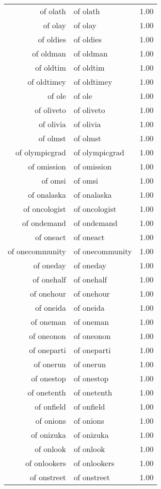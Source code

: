 \begin{table}[ht]
\begin{tabular}{rlr}
  of olath & of olath & 1.00 \\ 
  of olay & of olay & 1.00 \\ 
  of oldies & of oldies & 1.00 \\ 
  of oldman & of oldman & 1.00 \\ 
  of oldtim & of oldtim & 1.00 \\ 
  of oldtimey & of oldtimey & 1.00 \\ 
  of ole & of ole & 1.00 \\ 
  of oliveto & of oliveto & 1.00 \\ 
  of olivia & of olivia & 1.00 \\ 
  of olmst & of olmst & 1.00 \\ 
  of olympicgrad & of olympicgrad & 1.00 \\ 
  of omission & of omission & 1.00 \\ 
  of omsi & of omsi & 1.00 \\ 
  of onalaska & of onalaska & 1.00 \\ 
  of oncologist & of oncologist & 1.00 \\ 
  of ondemand & of ondemand & 1.00 \\ 
  of oneact & of oneact & 1.00 \\ 
  of onecommunity & of onecommunity & 1.00 \\ 
  of oneday & of oneday & 1.00 \\ 
  of onehalf & of onehalf & 1.00 \\ 
  of onehour & of onehour & 1.00 \\ 
  of oneida & of oneida & 1.00 \\ 
  of oneman & of oneman & 1.00 \\ 
  of oneonon & of oneonon & 1.00 \\ 
  of oneparti & of oneparti & 1.00 \\ 
  of onerun & of onerun & 1.00 \\ 
  of onestop & of onestop & 1.00 \\ 
  of onetenth & of onetenth & 1.00 \\ 
  of onfield & of onfield & 1.00 \\ 
  of onions & of onions & 1.00 \\ 
  of onizuka & of onizuka & 1.00 \\ 
  of onlook & of onlook & 1.00 \\ 
  of onlookers & of onlookers & 1.00 \\ 
  of onstreet & of onstreet & 1.00 \\ 

\end{tabular}
\end{table}
